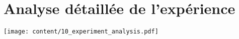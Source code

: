\chapter{Analyse détaillée de l'expérience}
\label{annex:experiment_analysis}

\texttt{[image: content/10\_experiment\_analysis.pdf]}
